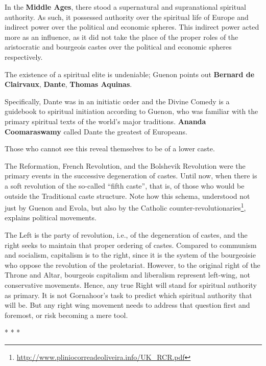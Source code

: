 In the \textbf{Middle Ages}, there stood a supernatural and supranational spiritual authority. As such, it possessed authority over the spiritual life of Europe and indirect power over the political and economic spheres. This indirect power acted more as an influence, as it did not take the place of the proper roles of the aristocratic and bourgeois castes over the political and economic spheres respectively.

The existence of a spiritual elite is undeniable; Guenon points out \textbf{Bernard de Clairvaux}, \textbf{Dante}, \textbf{Thomas Aquinas}.

Specifically, Dante was in an initiatic order and the Divine Comedy is a guidebook to spiritual initiation according to Guenon, who was familiar with the primary spiritual texts of the world's major traditions. \textbf{Ananda Coomaraswamy} called Dante the greatest of Europeans.

Those who cannot see this reveal themselves to be of a lower caste.

The Reformation, French Revolution, and the Bolshevik Revolution were the primary events in the successive degeneration of castes. Until now, when there is a soft revolution of the so-called ``fifth caste'', that is, of those who would be outside the Traditional caste structure. Note how this schema, understood not just by Guenon and Evola, but also by the Catholic counter-revolutionaries\footnote{\url{http://www.pliniocorreadeoliveira.info/UK_RCR.pdf}}, explains political movements.

The Left is the party of revolution, i.e., of the degeneration of castes, and the right seeks to maintain that proper ordering of castes. Compared to communism and socialism, capitalism is to the right, since it is the system of the bourgeoisie who oppose the revolution of the proletariat. However, to the original right of the Throne and Altar, bourgeois capitalism and liberalism represent left-wing, not conservative movements. Hence, any true Right will stand for spiritual authority as primary. It is not Gornahoor's task to predict which spiritual authority that will be. But any right wing movement needs to address that question first and foremost, or risk becoming a mere tool.



\begin{center}* * *\end{center}

